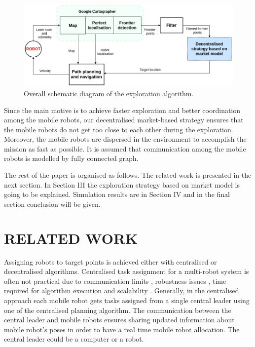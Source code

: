 \documentclass[letterpaper, 10 pt, conference]{ieeeconf}  %
\begin{document}
\begin{figure}
    \centering\includegraphics[width=1.0\columnwidth]{diagram_exploration.png}
	\caption{Overall schematic diagram of the exploration algorithm.}
   \label{fig:exploration-strategy}
\end{figure}

Since the main motive is to achieve faster exploration and better coordination among the mobile robots, our decentralised market-based strategy ensures that the mobile robots do not get too close to each other during the exploration. Moreover, the mobile robots are dispersed in the environment to accomplish the mission as fast as possible. It is assumed that communication among the mobile robots is modelled by fully connected graph.

The rest of the paper is organised as follows. The related work is presented in the next section. In Section III the exploration strategy based on market model is going to be explained. Simulation results are in Section IV and in the final section conclusion will be given.

\section{RELATED WORK}


Assigning robots to target points is achieved either with centralised or decentralised algorithms. 
Centralised task assignment for a multi-robot system is often not practical due to communication limits  \cite{free-market}, robustness issues \cite{survey-analysis}, time required for algorithm execution and scalability \cite{Julia}. Generally, in the centralised approach each mobile robot gets tasks assigned from a single central leader using one of the centralised planning algorithm. The communication between the central leader and mobile robots ensures sharing updated information about mobile robot's poses in order to have a real time mobile robot allocation. The central leader could be a computer or a robot.
\end{document}
